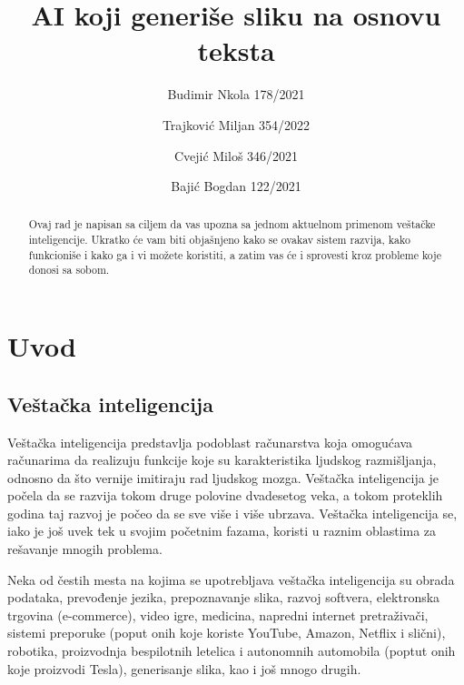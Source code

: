 \documentclass[12pt, letterpaper]{article}
\begin{document}
\title{AI koji generiše sliku na osnovu teksta}
\author{Budimir Nkola 178/2021\\ \and Trajković Miljan 354/2022 \and Cvejić Miloš 346/2021\\ \and Bajić Bogdan 122/2021}
\maketitle

\begin{abstract}
    Ovaj rad je napisan sa ciljem da vas upozna sa jednom aktuelnom primenom veštačke inteligencije. Ukratko će vam biti objašnjeno kako se ovakav sistem razvija, kako funkcioniše i kako ga i vi možete koristiti, a zatim vas će i sprovesti kroz probleme koje donosi sa sobom.
\end{abstract}
\begin{tableofcontents}
\end{tableofcontents}

\pagebreak 

\section{Uvod} 

\subsection*{Veštačka inteligencija} 

Veštačka inteligencija predstavlja podoblast računarstva koja omogućava računarima da realizuju funkcije koje su karakteristika ljudskog razmišljanja, odnosno da što vernije imitiraju rad ljudskog mozga. Veštačka inteligencija je počela da se razvija tokom druge polovine dvadesetog veka, a tokom proteklih godina taj razvoj je počeo da se sve više i više ubrzava. Veštačka inteligencija se, iako je još uvek tek u svojim početnim fazama, koristi u raznim oblastima za rešavanje mnogih problema. \cite{kljucJedan} 

  

Neka od čestih mesta na kojima se upotrebljava veštačka inteligencija su obrada podataka, prevođenje jezika, prepoznavanje slika, razvoj softvera, elektronska trgovina (e-commerce), video igre, medicina, napredni internet pretraživači, sistemi preporuke (poput onih koje koriste YouTube, Amazon, Netflix i slični), robotika, proizvodnja bespilotnih letelica i autonomnih automobila (poptut onih koje proizvodi Tesla), generisanje slika, kao i još mnogo drugih.  
\end{document}
